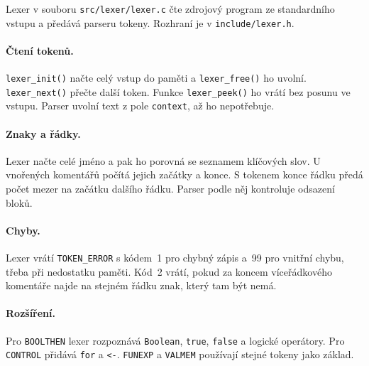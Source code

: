\documentclass[11pt,a4paper]{article}
\begin{document}
Lexer v souboru \texttt{src/lexer/lexer.c} čte zdrojový program ze standardního
vstupu a předává parseru tokeny. Rozhraní je v \texttt{include/lexer.h}.

\paragraph{Čtení tokenů.}
\texttt{lexer\_init()} načte celý vstup do paměti a \texttt{lexer\_free()}
ho uvolní. \texttt{lexer\_next()} přečte další token. Funkce
\texttt{lexer\_peek()} ho vrátí bez posunu ve vstupu. Parser uvolní text
z pole \texttt{context}, až ho nepotřebuje.

\paragraph{Znaky a řádky.}
Lexer načte celé jméno a pak ho porovná se seznamem klíčových slov.
U vnořených komentářů počítá jejich začátky a konce. S tokenem konce
řádku předá počet mezer na začátku dalšího řádku. Parser podle něj
kontroluje odsazení bloků.

\paragraph{Chyby.}
Lexer vrátí \texttt{TOKEN\_ERROR} s kódem~1 pro chybný zápis a~99 pro
vnitřní chybu, třeba při nedostatku paměti. Kód~2 vrátí, pokud za koncem
víceřádkového komentáře najde na stejném řádku znak, který tam být nemá.

\paragraph{Rozšíření.}
Pro \texttt{BOOLTHEN} lexer rozpoznává \texttt{Boolean}, \texttt{true},
\texttt{false} a logické operátory. Pro \texttt{CONTROL} přidává
\texttt{for} a \texttt{<-}. \texttt{FUNEXP} a \texttt{VALMEM}
používají stejné tokeny jako základ.
\end{document}
